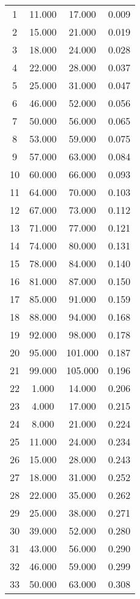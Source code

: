 % 
\begin{tabular}{cccc}
  \hline
  \hline
1 & 11.000 & 17.000 & 0.009 \\ 
  2 & 15.000 & 21.000 & 0.019 \\ 
  3 & 18.000 & 24.000 & 0.028 \\ 
  4 & 22.000 & 28.000 & 0.037 \\ 
  5 & 25.000 & 31.000 & 0.047 \\ 
  6 & 46.000 & 52.000 & 0.056 \\ 
  7 & 50.000 & 56.000 & 0.065 \\ 
  8 & 53.000 & 59.000 & 0.075 \\ 
  9 & 57.000 & 63.000 & 0.084 \\ 
  10 & 60.000 & 66.000 & 0.093 \\ 
  11 & 64.000 & 70.000 & 0.103 \\ 
  12 & 67.000 & 73.000 & 0.112 \\ 
  13 & 71.000 & 77.000 & 0.121 \\ 
  14 & 74.000 & 80.000 & 0.131 \\ 
  15 & 78.000 & 84.000 & 0.140 \\ 
  16 & 81.000 & 87.000 & 0.150 \\ 
  17 & 85.000 & 91.000 & 0.159 \\ 
  18 & 88.000 & 94.000 & 0.168 \\ 
  19 & 92.000 & 98.000 & 0.178 \\ 
  20 & 95.000 & 101.000 & 0.187 \\ 
  21 & 99.000 & 105.000 & 0.196 \\ 
  22 & 1.000 & 14.000 & 0.206 \\ 
  23 & 4.000 & 17.000 & 0.215 \\ 
  24 & 8.000 & 21.000 & 0.224 \\ 
  25 & 11.000 & 24.000 & 0.234 \\ 
  26 & 15.000 & 28.000 & 0.243 \\ 
  27 & 18.000 & 31.000 & 0.252 \\ 
  28 & 22.000 & 35.000 & 0.262 \\ 
  29 & 25.000 & 38.000 & 0.271 \\ 
  30 & 39.000 & 52.000 & 0.280 \\ 
  31 & 43.000 & 56.000 & 0.290 \\ 
  32 & 46.000 & 59.000 & 0.299 \\ 
  33 & 50.000 & 63.000 & 0.308 \\ 

\end{tabular}
